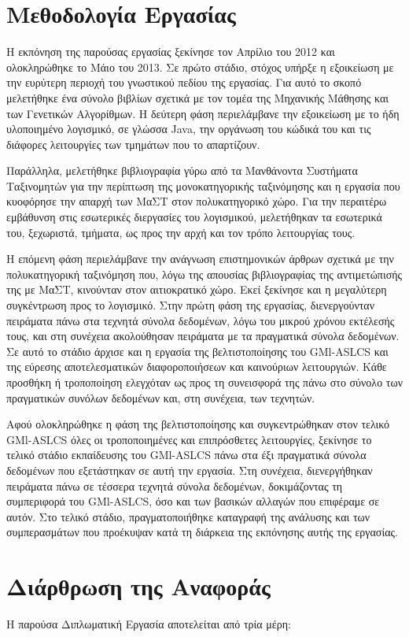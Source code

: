 \section{Μεθοδολογία Εργασίας}
Η εκπόνηση της παρούσας εργασίας ξεκίνησε τον Απρίλιο του 2012 και ολοκληρώθηκε το Μάιο του 2013. Σε πρώτο στάδιο, στόχος υπήρξε η εξοικείωση με την ευρύτερη περιοχή του γνωστικού πεδίου της εργασίας. Για αυτό το σκοπό μελετήθηκε ένα σύνολο βιβλίων σχετικά με τον τομέα της Μηχανικής Μάθησης και των Γενετικών Αλγορίθμων. Η δεύτερη φάση περιελάμβανε την εξοικείωση με το ήδη υλοποιημένο λογισμικό, σε γλώσσα Java, την οργάνωση του κώδικά του και τις διάφορες λειτουργίες των τμημάτων που το απαρτίζουν. 

Παράλληλα, μελετήθηκε βιβλιογραφία γύρω από τα Μανθάνοντα Συστήματα Ταξινομητών για την περίπτωση της μονοκατηγορικής ταξινόμησης και η εργασία που κυοφόρησε την απαρχή των ΜαΣΤ στον πολυκατηγορικό χώρο. Για την περαιτέρω εμβάθυνση στις εσωτερικές διεργασίες του λογισμικού, μελετήθηκαν τα εσωτερικά του, ξεχωριστά, τμήματα, ως προς την αρχή και τον τρόπο λειτουργίας τους. 

Η επόμενη φάση περιελάμβανε την ανάγνωση επιστημονικών άρθρων σχετικά με την πολυκατηγορική ταξινόμηση που, λόγω της απουσίας βιβλιογραφίας της αντιμετώπισής της με ΜαΣΤ, κινούνταν στον αιτιοκρατικό χώρο. Εκεί ξεκίνησε και η μεγαλύτερη συγκέντρωση προς το λογισμικό. Στην πρώτη φάση της εργασίας, διενεργούνταν πειράματα πάνω στα τεχνητά σύνολα δεδομένων, λόγω του μικρού χρόνου εκτέλεσής τους, και στη συνέχεια ακολούθησαν πειράματα με τα πραγματικά σύνολα δεδομένων. Σε αυτό το στάδιο άρχισε και η εργασία της βελτιστοποίησης του GMl-ASLCS και της εύρεσης αποτελεσματικών διαφοροποιήσεων και καινούριων λειτουργιών. Κάθε προσθήκη ή τροποποίηση ελεγχόταν ως προς τη συνεισφορά της πάνω στο σύνολο των πραγματικών συνόλων δεδομένων και, στη συνέχεια, των τεχνητών. 

Αφού ολοκληρώθηκε η φάση της βελτιστοποίησης και συγκεντρώθηκαν στον τελικό GMl-ASLCS όλες οι τροποποιημένες και επιπρόσθετες λειτουργίες, ξεκίνησε το τελικό στάδιο εκπαίδευσης του GMl-ASLCS πάνω στα έξι πραγματικά σύνολα δεδομένων που εξετάστηκαν σε αυτή την εργασία. Στη συνέχεια, διενεργήθηκαν πειράματα πάνω σε τέσσερα τεχνητά σύνολα δεδομένων, δοκιμάζοντας τη συμπεριφορά του GMl-ASLCS, όσο και των βασικών αλλαγών που επιφέραμε σε αυτόν. Στο τελικό στάδιο, πραγματοποιήθηκε καταγραφή της ανάλυσης και των συμπερασμάτων που προέκυψαν κατά τη διάρκεια της εκπόνησης αυτής της εργασίας.

\section{Διάρθρωση της Αναφοράς}
Η παρούσα Διπλωματική Εργασία αποτελείται από τρία μέρη:


